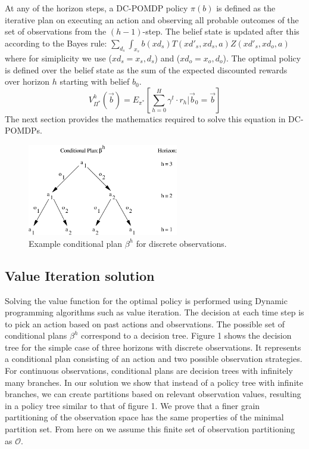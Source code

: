\documentclass{article}
\begin{document}
 At any of the horizon steps, a DC-POMDP policy $\pi(b)$ is defined as the iterative plan on executing an action and observing all probable outcomes of the set of observations from the $(h-1)$-step. The belief state is updated after this according to the Bayes rule: $\sum_{d_s}\int_{x_s} b(xd_s)T(xd'_s,xd_s,a)Z(xd'_s,xd_o,a)$  where for simiplicity we use ($xd_s = x_s,d_s$) and ($xd_o=x_o,d_o$).
The optimal policy is defined over the belief state as the sum of the expected discounted rewards over horizon $h$ starting with belief $b_0$.
\begin{equation}
V^h_{\Pi^*}(\vec{b}) = E_{\pi^*} \left[ \sum_{h=0}^{H} \gamma^t \cdot r_h \Big| \vec{b}_0 = \vec{b} \right]\nonumber
\end{equation}
The next section provides the mathematics required to solve this equation in DC-POMDPs.
\begin{figure}[t!]
\begin{center}
\includegraphics[height=4cm]{cond_plan2}
\end{center}
\vspace{-2mm}
\caption{\footnotesize Example conditional plan $\beta^h$ for discrete observations.}
\label{fig:cond_plan}
\vspace{-1mm}
\end{figure}

\subsection{Value Iteration solution} 
Solving the value function for the optimal policy is performed using Dynamic programming algorithms such as value iteration. 
The decision at each time step is to pick an action based on past actions and observations. The possible set of conditional plans $\beta^h$ correspond to a decision tree. Figure 1 shows the decision tree for the simple case of three horizons with discrete observations. It represents a conditional plan consisting of an action and two possible observation strategies. For continuous observations, conditional plans are decision trees with infinitely many branches. In our solution we show that instead of a policy tree with infinite branches, we can create partitions based on relevant observation values, resulting in a policy tree similar to that of figure 1. We prove that a finer grain partitioning of the observation space has the same properties of the minimal partition set. From here on we assume this finite set of observation partitioning as $\mathcal{O}$.
\end{document}

